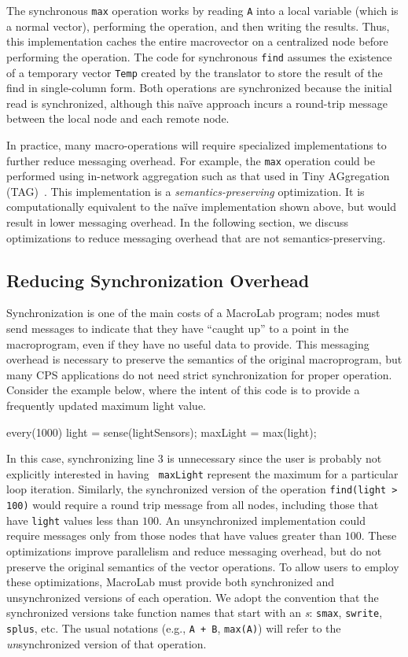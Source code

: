 \noindent The synchronous {\tt max} operation works by reading {\tt A} into a
local variable (which is a normal vector), performing the operation,
and then writing the results.  Thus, this implementation caches the
entire macrovector on a centralized node before performing the
operation.  The code for synchronous {\tt find} assumes the existence
of a temporary vector {\tt Temp} created by the translator to store
the result of the find in single-column form.  Both operations are
synchronized because the initial read is synchronized, although this
na\"{i}ve approach incurs a round-trip message between the local node and each
remote node.

In practice, many macro-operations will require specialized
implementations to further reduce messaging overhead.  For example,
the {\tt max} operation could be performed using in-network
aggregation such as that used in Tiny AGgregation
(TAG)~\cite{Madden2002}.  This implementation is a {\em
  semantics-preserving} optimization. It is computationally equivalent
to the na\"{i}ve implementation shown above, but would result in lower
messaging overhead.  In the following section, we discuss
optimizations to reduce messaging overhead that are not
semantics-preserving.

\subsection{Reducing Synchronization Overhead}

Synchronization is one of the main costs of a MacroLab program; nodes
must send messages to indicate that they have ``caught up'' to a point
in the macroprogram, even if they have no useful data to provide.
This messaging overhead is necessary to preserve the semantics of the
original macroprogram, but many CPS applications do not need strict
synchronization for proper operation.  Consider the example below,
where the intent of this code is to provide a frequently updated
maximum light value.

\begin{macrolab}
every(1000) {
  light = sense(lightSensors);
  maxLight = max(light);
}
\end{macrolab}

\noindent In this case, synchronizing line 3 is unnecessary since the
user is probably not explicitly interested in having {\tt
  maxLight} represent the maximum for a particular loop iteration.
Similarly, the synchronized version of the operation {\tt find(light >
  100)} would require a round trip message from all nodes, including
those that have {\tt light} values less than $100$.  An unsynchronized
implementation could require messages only from those nodes that have
values greater than $100$.  These optimizations improve parallelism
and reduce messaging overhead, but do not preserve the original
semantics of the vector operations.  To allow users to employ
these optimizations, MacroLab must provide both synchronized and
unsynchronized versions of each operation.  We adopt the convention
that the synchronized versions take function names that start with an
\emph{s}: {\tt smax}, {\tt swrite}, {\tt splus}, etc. The usual
notations (e.g., {\tt A + B}, {\tt max(A)}) will refer to the
\emph{un}synchronized version of that operation.

